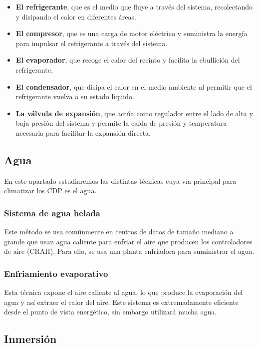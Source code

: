 \begin{itemize}
    \item {\textbf{El refrigerante}}, que es el medio que fluye a través del sistema, recolectando y disipando el calor en diferentes áreas.
    \item \textbf{El compresor}, que es una carga de motor eléctrico y suministra la energía para impulsar el refrigerante a través del sistema.
    \item \textbf{El evaporador}, que recoge el calor del recinto y facilita la ebullición del refrigerante.
    \item \textbf{El condensador}, que disipa el calor en el medio ambiente al permitir que el refrigerante vuelva a su estado líquido.
    \item \textbf{La válvula de expansión}, que actúa como regulador entre el lado de alta y baja presión del sistema y permite la caída de presión y temperatura necesaria para facilitar la expansión directa.
\end{itemize}

\subsection{Agua}

En este apartado estudiaremos las distintas técnicas cuya vía principal para climatizar los CDP es el agua.

\subsubsection{Sistema de agua helada}

Este método se usa comúnmente en centros de datos de tamaño mediano a grande que usan agua caliente para enfriar el aire que producen los controladores de aire (CRAH). Para ello, se usa una planta enfriadora para suministrar el agua.

\subsubsection{Enfriamiento evaporativo}

Esta técnica expone el aire caliente al agua, lo que produce la evaporación del agua y así extraer el calor del aire. Este sistema es extremadamente eficiente desde el punto de vista energético, sin embargo utilizará mucha agua.

\subsection{Inmersión}

